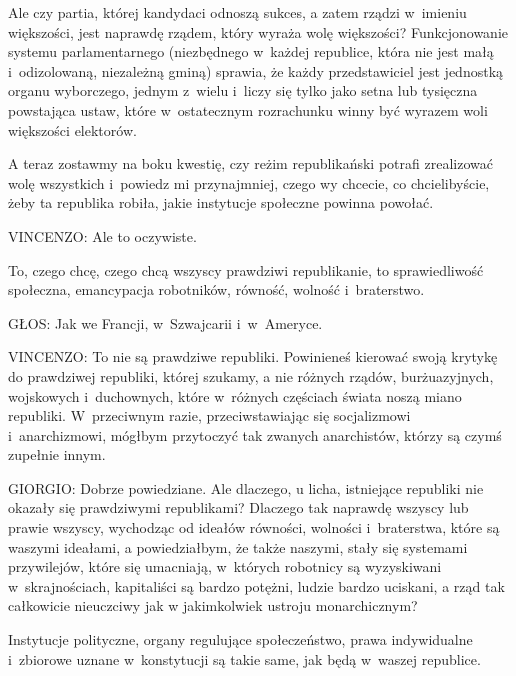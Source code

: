 \documentclass[oneside,polish,11pt,sfheadings]{mwbk}
\begin{document}
 
Ale czy partia, której kandydaci odnoszą sukces, a zatem rządzi w~imieniu większości, jest naprawdę rządem, który wyraża
wolę większości? Funkcjonowanie systemu parlamentarnego (niezbędnego w~każdej republice, która nie jest małą i~odizolowaną, niezależną gminą) sprawia, że każdy przedstawiciel jest jednostką organu wyborczego, jednym z~wielu i~liczy się tylko jako setna lub tysięczna powstająca ustaw, które w~ostatecznym rozrachunku winny być wyrazem woli
większości elektorów. 

 
A teraz zostawmy na boku kwestię, czy reżim republikański potrafi zrealizować wolę wszystkich i~powiedz mi przynajmniej,
czego wy chcecie, co chcielibyście, żeby ta republika robiła, jakie instytucje społeczne powinna powołać. 




 
\noindent VINCENZO: Ale to oczywiste. 

 
To, czego chcę, czego chcą wszyscy prawdziwi republikanie, to sprawiedliwość społeczna, emancypacja robotników, równość,
wolność i~braterstwo. 




 
\noindent GŁOS: Jak we Francji, w~Szwajcarii i~w~Ameryce. 




 
\noindent VINCENZO: To nie są prawdziwe republiki. Powinieneś kierować swoją krytykę do prawdziwej republiki, której szukamy, a
nie różnych rządów, burżuazyjnych, wojskowych i~duchownych, które w~różnych częściach świata noszą miano republiki. W~przeciwnym razie, przeciwstawiając się socjalizmowi i~anarchizmowi, mógłbym przytoczyć tak zwanych anarchistów, którzy
są czymś zupełnie innym. 




 
\noindent GIORGIO: Dobrze powiedziane. Ale dlaczego, u licha, istniejące republiki nie okazały się prawdziwymi republikami?
Dlaczego tak naprawdę wszyscy lub prawie wszyscy, wychodząc od ideałów równości, wolności i~braterstwa, które są
waszymi ideałami, a powiedziałbym, że także naszymi, stały się systemami przywilejów, które się umacniają, w~których
robotnicy są wyzyskiwani w~skrajnościach, kapitaliści są bardzo potężni, ludzie bardzo uciskani, a rząd tak całkowicie
nieuczciwy jak w jakimkolwiek ustroju monarchicznym? 

 
Instytucje polityczne, organy regulujące społeczeństwo, prawa indywidualne i~zbiorowe uznane w~konstytucji są takie
same, jak będą w~waszej republice. 
\end{document}
